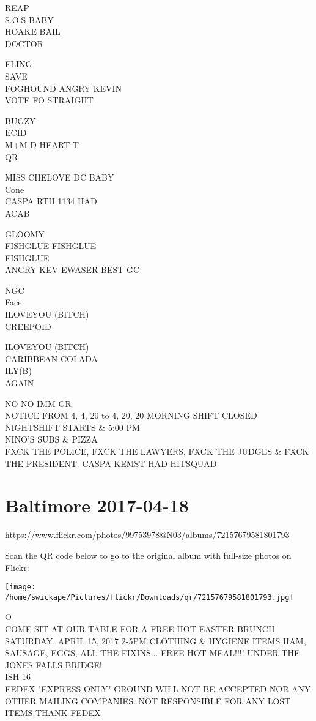 \documentclass[10pt,letterpaper]{article}
\begin{document}
REAP\\
S.O.S BABY\\
HOAKE BAIL\\
DOCTOR

FLING\\
SAVE\\
FOGHOUND ANGRY KEVIN\\
VOTE FO STRAIGHT

BUGZY\\
ECID\\
M+M D HEART T\\
QR

MISS CHELOVE DC BABY\\
Cone\\
CASPA RTH 1134 HAD\\
ACAB

GLOOMY\\
FISHGLUE FISHGLUE\\
FISHGLUE\\
ANGRY KEV EWASER BEST GC

NGC\\
Face\\
ILOVEYOU (BITCH)\\
CREEPOID

ILOVEYOU (BITCH)\\
CARIBBEAN COLADA\\
ILY(B)\\
AGAIN

NO NO IMM GR\\
NOTICE FROM 4, 4, 20 to 4, 20, 20 MORNING SHIFT CLOSED NIGHTSHIFT STARTS \& 5:00 PM\\
NINO'S SUBS \& PIZZA\\
FXCK THE POLICE, FXCK THE LAWYERS, FXCK THE JUDGES \& FXCK THE PRESIDENT.  CASPA KEMST HAD HITSQUAD


\section*{Baltimore 2017-04-18}

\url{https://www.flickr.com/photos/99753978@N03/albums/72157679581801793}

Scan the QR code below to go to the original album with full-size photos on Flickr:

\texttt{[image: /home/swickape/Pictures/flickr/Downloads/qr/72157679581801793.jpg]}


O\\
COME SIT AT OUR TABLE FOR A FREE HOT EASTER BRUNCH SATURDAY, APRIL 15, 2017 2{-}5PM CLOTHING \& HYGIENE ITEMS HAM, SAUSAGE, EGGS, ALL THE FIXINS... FREE HOT MEAL!!!! UNDER THE JONES FALLS BRIDGE!\\
ISH 16\\
FEDEX "EXPRESS ONLY" GROUND WILL NOT BE ACCEPTED NOR ANY OTHER MAILING COMPANIES.  NOT RESPONSIBLE FOR ANY LOST ITEMS THANK FEDEX
\end{document}
